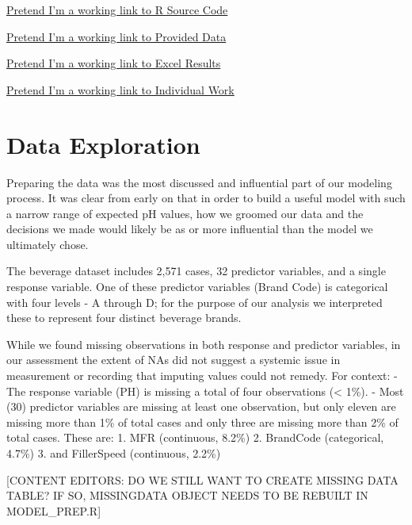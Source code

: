 \documentclass[]{report}
\begin{document}
\begin{compactitem}
  \item \href{https://github.com/JeremyOBrien16/CUNY_DATA_624/tree/master/Project_Two}{Pretend I'm a working link to R Source Code}
  \item \href{https://github.com/JeremyOBrien16/CUNY_DATA_624/tree/master/Project_Two}{Pretend I'm a working link to Provided Data}
  \item \href{https://github.com/JeremyOBrien16/CUNY_DATA_624/tree/master/Project_Two}{Pretend I'm a working link to Excel Results}
  \item \href{https://github.com/JeremyOBrien16/CUNY_DATA_624/tree/master/Project_Two}{Pretend I'm a working link to Individual Work}
\end{compactitem}

\hypertarget{data-exploration}{%
\chapter{Data Exploration}\label{data-exploration}}

Preparing the data was the most discussed and influential part of our
modeling process. It was clear from early on that in order to build a
useful model with such a narrow range of expected pH values, how we
groomed our data and the decisions we made would likely be as or more
influential than the model we ultimately chose.

The beverage dataset includes 2,571 cases, 32 predictor variables, and a
single response variable. One of these predictor variables (Brand Code)
is categorical with four levels - A through D; for the purpose of our
analysis we interpreted these to represent four distinct beverage
brands.

While we found missing observations in both response and predictor
variables, in our assessment the extent of NAs did not suggest a
systemic issue in measurement or recording that imputing values could
not remedy. For context: - The response variable (PH) is missing a total
of four observations (\textless{} 1\%). - Most (30) predictor variables
are missing at least one observation, but only eleven are missing more
than 1\% of total cases and only three are missing more than 2\% of
total cases. These are: 1. MFR (continuous, 8.2\%) 2. BrandCode
(categorical, 4.7\%) 3. and FillerSpeed (continuous, 2.2\%)

{[}CONTENT EDITORS: DO WE STILL WANT TO CREATE MISSING DATA TABLE? IF
SO, MISSINGDATA OBJECT NEEDS TO BE REBUILT IN MODEL\_PREP.R{]}
\end{document}
